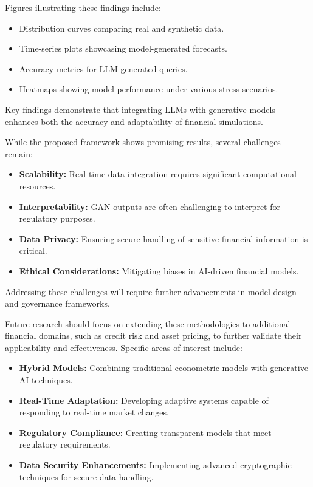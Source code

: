 \documentclass[a4paper,12pt]{scrbook}
\begin{document}
	Figures illustrating these findings include:
	
	\begin{itemize}
		\item Distribution curves comparing real and synthetic data.
		\item Time-series plots showcasing model-generated forecasts.
		\item Accuracy metrics for LLM-generated queries.
		\item Heatmaps showing model performance under various stress scenarios.
	\end{itemize}
	
	Key findings demonstrate that integrating LLMs with generative models enhances both the accuracy and adaptability of financial simulations.
	
	
	While the proposed framework shows promising results, several challenges remain:
	
	\begin{itemize}
		\item \textbf{Scalability:} Real-time data integration requires significant computational resources.
		\item \textbf{Interpretability:} GAN outputs are often challenging to interpret for regulatory purposes.
		\item \textbf{Data Privacy:} Ensuring secure handling of sensitive financial information is critical.
		\item \textbf{Ethical Considerations:} Mitigating biases in AI-driven financial models.
	\end{itemize}
	
	Addressing these challenges will require further advancements in model design and governance frameworks.
	
	
	Future research should focus on extending these methodologies to additional financial domains, such as credit risk and asset pricing, to further validate their applicability and effectiveness. Specific areas of interest include:
	
	\begin{itemize}
		\item \textbf{Hybrid Models:} Combining traditional econometric models with generative AI techniques.
		\item \textbf{Real-Time Adaptation:} Developing adaptive systems capable of responding to real-time market changes.
		\item \textbf{Regulatory Compliance:} Creating transparent models that meet regulatory requirements.
		\item \textbf{Data Security Enhancements:} Implementing advanced cryptographic techniques for secure data handling.
	\end{itemize}
	
\end{document}

